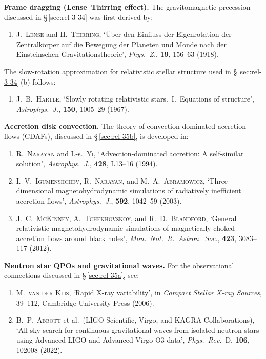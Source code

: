 \noindent \textbf{Frame dragging (Lense--Thirring effect).}  The
gravitomagnetic precession discussed in \S\,\ref{sec:rel-3-34} was
first derived by:

\begin{enumerate}
\item[R8.] J.~\textsc{Lense} and H.~\textsc{Thirring}, `\"Uber den
  Einfluss der Eigenrotation der Zentralk\"orper auf die Bewegung der
  Planeten und Monde nach der Einsteinschen Gravitationstheorie',
  \emph{Phys.\ Z.}, \textbf{19}, 156--63 (1918).
\end{enumerate}

\noindent The slow-rotation approximation for relativistic stellar structure
used in \S\,\ref{sec:rel-3-34}\,(b) follows:

\begin{enumerate}
\item[R9.] J.~B.~\textsc{Hartle}, `Slowly rotating relativistic stars.\
  I.\ Equations of structure', \emph{Astrophys.\ J.}, \textbf{150},
  1005--29 (1967).
\end{enumerate}

\noindent \textbf{Accretion disk convection.}  The theory of
convection-dominated accretion flows (CDAFs), discussed in
\S\,\ref{sec:rel-35b}, is developed in:

\begin{enumerate}
\item[R10.] R.~\textsc{Narayan} and I.-s.~\textsc{Yi}, `Advection-dominated
  accretion: A self-similar solution', \emph{Astrophys.\ J.}, \textbf{428},
  L13--16 (1994).

\item[R11.] I.~V.~\textsc{Igumenshchev}, R.~\textsc{Narayan}, and
  M.~A.~\textsc{Abramowicz}, `Three-dimensional magnetohydrodynamic
  simulations of radiatively inefficient accretion flows', \emph{Astrophys.\
  J.}, \textbf{592}, 1042--59 (2003).

\item[R12.] J.~C.~\textsc{McKinney}, A.~\textsc{Tchekhovskoy}, and
  R.~D.~\textsc{Blandford}, `General relativistic magnetohydrodynamic
  simulations of magnetically choked accretion flows around black holes',
  \emph{Mon.\ Not.\ R.\ Astron.\ Soc.}, \textbf{423}, 3083--117 (2012).
\end{enumerate}

\noindent \textbf{Neutron star QPOs and gravitational waves.}  For the
observational connections discussed in \S\,\ref{sec:rel-35a}, see:

\begin{enumerate}
\item[R13.] M.~\textsc{van der Klis}, `Rapid X-ray variability', in
  \emph{Compact Stellar X-ray Sources}, 39--112, Cambridge University
  Press (2006).

\item[R14.] B.~P.~\textsc{Abbott} et al.\ (LIGO Scientific, Virgo, and
  KAGRA Collaborations), `All-sky search for continuous gravitational
  waves from isolated neutron stars using Advanced LIGO and Advanced Virgo
  O3 data', \emph{Phys.\ Rev.}~D, \textbf{106}, 102008 (2022).
\end{enumerate}

